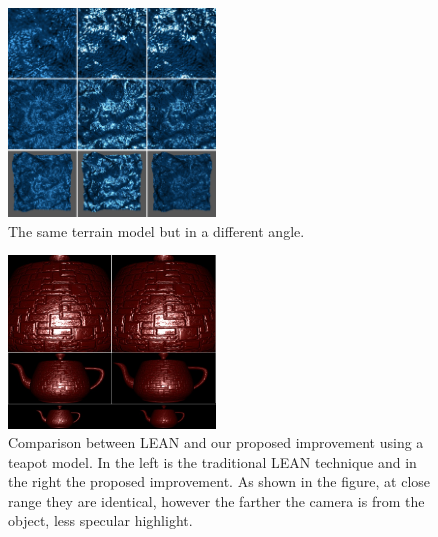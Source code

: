 \documentclass[10pt, conference]{IEEEtran}
\begin{document}
\begin{figure}[h]
	\includegraphics[width=0.49\textwidth]{figs/terrain2.png}
	\caption{The same terrain model but in a different angle.}
	\label{fig:terrain2}
\end{figure}

\begin{figure}[h]
	\includegraphics[width=0.49\textwidth]{figs/LS1.png}
	\caption{Comparison between LEAN and our proposed improvement using a teapot model. In the left is the traditional LEAN technique and in the right the proposed improvement. As shown in the figure, at close range they are identical, however the farther the camera is from the object, less specular highlight.}
	\label{fig:LS1}
\end{figure}

\end{document}
